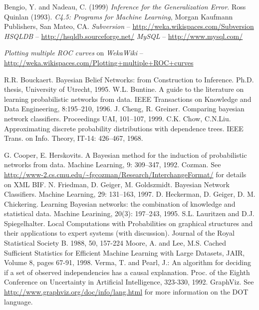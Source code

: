 \begin{thebibliography}{999}
		Bengio, Y. and Nadeau, C. (1999) \textit{Inference for the Generalization Error}.
		Ross Quinlan (1993). \textit{C4.5: Programs for Machine Learning}, Morgan Kaufmann Publishers, San Mateo, CA.
		\textit{Subversion} -- \url{http://weka.wikispaces.com/Subversion}{}
		\textit{HSQLDB} -- \url{http://hsqldb.sourceforge.net/}{}
		\textit{MySQL} -- \url{http://www.mysql.com/}{}

		\textit{Plotting multiple ROC curves} on \textit{WekaWiki} -- \\
		\small{\url{http://weka.wikispaces.com/Plotting+multiple+ROC+curves}{}}

		R.R. Bouckaert. Bayesian Belief Networks: from Construction to Inference. 
		Ph.D. thesis, 
		University of Utrecht, 
		1995.
		W.L. Buntine. A guide to the literature on learning probabilistic networks from data.
		IEEE Transactions on Knowledge and Data Engineering, 8:195--210, 
		1996. 
		J. Cheng, R. Greiner. 
		Comparing bayesian network classifiers. 
		Proceedings UAI,
		101--107,
		1999.
		C.K. Chow, C.N.Liu.
		Approximating discrete probability distributions with dependence trees.
		IEEE Trans. on Info. Theory, IT-14: 426--467, 1968.

	\newpage

		G. Cooper, E. Herskovits. 
		A Bayesian method for the induction of probabilistic networks from data. 
		Machine Learning, 9: 309--347, 1992.
		Cozman.
		See {\sf \url{http://www-2.cs.cmu.edu/\~fgcozman/Research/InterchangeFormat/}{}}
		for details on XML BIF.
		N. Friedman, D. Geiger, M. Goldszmidt. 
		Bayesian Network Classifiers. 
		Machine Learning, 29: 131--163, 1997.
		D. Heckerman, D. Geiger, D. M. Chickering. 
		Learning Bayesian networks: the combination of knowledge and statistical data. 
		Machine Learining, 20(3): 197--243, 1995.
		S.L. Lauritzen and D.J. Spiegelhalter.
		Local Computations with Probabilities on graphical structures and their applications to expert systems (with discussion).
		Journal of the Royal Statistical Society B.
		1988, 50, 157-224
		Moore, A. and Lee, M.S. Cached Sufficient Statistics for Efficient Machine Learning with Large Datasets,
		JAIR, Volume 8, pages 67-91, 1998.
		Verma, T. and Pearl, J.:
		An algorithm for deciding if a set of observed independencies has a causal explanation.
		Proc. of the Eighth Conference on Uncertainty in Artificial Intelligence,
		323-330, 1992.
		GraphViz. See \url{http://www.graphviz.org/doc/info/lang.html}{} for
		more information on the DOT language.

\end{thebibliography}
